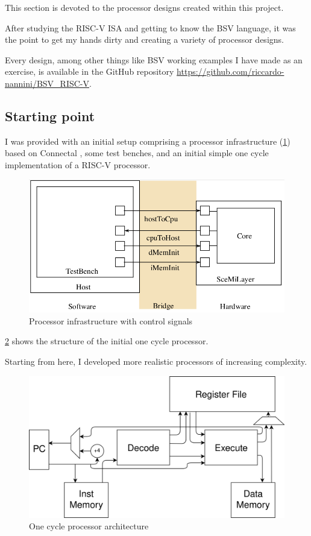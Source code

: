 \documentclass[12pt,oneside,a4paper]{article}
\begin{document}
This section is devoted to the processor designs created within this project.

After studying the RISC-V ISA and getting to know the BSV language, it was the point to get my hands dirty and creating a variety of processor designs.

Every design, among other things like BSV working examples I have made as an exercise, is available in the GitHub repository \url{https://github.com/riccardo-nannini/BSV_RISC-V}.
\subsection{Starting point}
I was provided with an initial setup comprising a processor infrastructure (\cref{infrastructure}) based on Connectal \cite{connectal}, some test benches, and an initial simple one cycle implementation of a RISC-V processor.

\begin{figure}[h]
	\centering
	\includegraphics[scale=0.4]{infrastructure.png}
	\caption{Processor infrastructure with control signals}
	\label{infrastructure}
\end{figure}

\cref{onecycle} shows the structure of the initial one cycle processor. 

Starting from here, I developed more realistic processors of increasing complexity. 


\begin{figure}[h]
	\centering
	\includegraphics[scale=0.75]{onecycle.png}
	\caption{One cycle processor architecture}
	\label{onecycle}
\end{figure}
\end{document}
